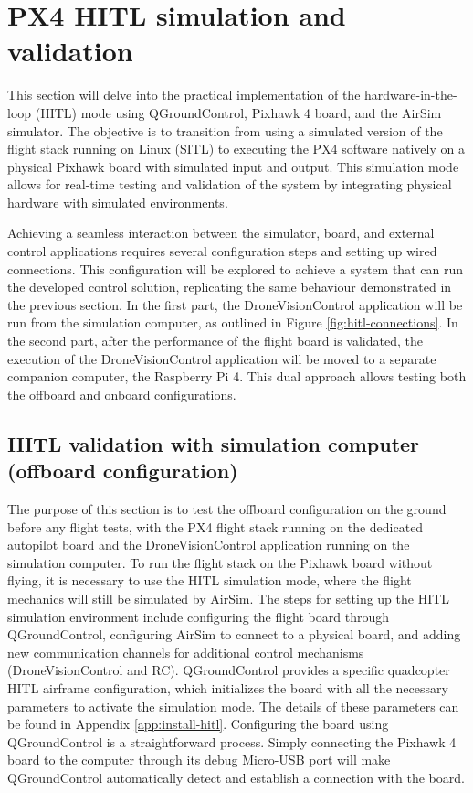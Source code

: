 \section{PX4 HITL simulation and validation}
\label{sec:test-4-hitl}


This section will delve into the practical implementation of the hardware-in-the-loop (HITL) mode using QGroundControl, Pixhawk 4 board, and the AirSim simulator. The objective is to transition from using a simulated version of the flight stack running on Linux (SITL) to executing the PX4 software natively on a physical Pixhawk board with simulated input and output. This simulation mode allows for real-time testing and validation of the system by integrating physical hardware with simulated environments. 

Achieving a seamless interaction between the simulator, board, and external control applications requires several configuration steps and setting up wired connections. This configuration will be explored to achieve a system that can run the developed control solution, replicating the same behaviour demonstrated in the previous section. In the first part, the DroneVisionControl application will be run from the simulation computer, as outlined in Figure \ref{fig:hitl-connections}. In the second part, after the performance of the flight board is validated, the execution of the DroneVisionControl application will be moved to a separate companion computer, the Raspberry Pi 4. This dual approach allows testing both the offboard and onboard configurations.

\subsection{HITL validation with simulation computer (offboard configuration)}

The purpose of this section is to test the offboard configuration on the ground before any flight tests, with the PX4 flight stack running on the dedicated autopilot board and the DroneVisionControl application running on the simulation computer. To run the flight stack on the Pixhawk board without flying, it is necessary to use the HITL simulation mode, where the flight mechanics will still be simulated by AirSim. The steps for setting up the HITL simulation environment include configuring the flight board through QGroundControl, configuring AirSim to connect to a physical board, and adding new communication channels for additional control mechanisms (DroneVisionControl and RC). QGroundControl provides a specific quadcopter HITL airframe configuration, which initializes the board with all the necessary parameters to activate the simulation mode. The details of these parameters can be found in Appendix \ref{app:install-hitl}. Configuring the board using QGroundControl is a straightforward process. Simply connecting the Pixhawk 4 board to the computer through its debug Micro-USB port will make QGroundControl automatically detect and establish a connection with the board.


